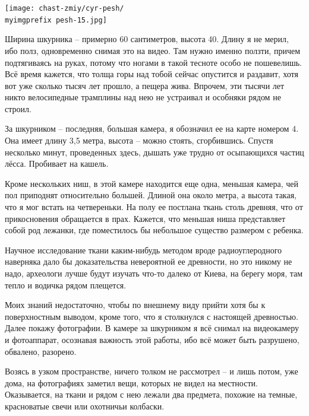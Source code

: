 \begin{center}
\texttt{[image: chast-zmiy/cyr-pesh/\\myimgprefix pesh-15.jpg]}
\end{center}

Ширина шкурника – примерно 60 сантиметров, высота 40. Длину я не мерил, ибо полз, одновременно снимая это на видео. Там нужно именно ползти, причем подтягиваясь на руках, потому что ногами в такой тесноте особо не пошевелишь. Всё время кажется, что толща горы над тобой сейчас опустится и раздавит, хотя вот уже сколько тысяч лет прошло, а пещера жива. Впрочем, эти тысячи лет никто велосипедные трамплины над нею не устраивал и особняки рядом не строил.


За шкурником – последняя, большая камера, я обозначил ее на карте номером 4. Она имеет длину 3,5 метра, высота – можно стоять, сгорбившись. Спустя несколько минут, проведенных здесь, дышать уже трудно от осыпающихся частиц лёсса. Пробивает на кашель.


Кроме нескольких ниш, в этой камере находится еще одна, меньшая камера, чей пол приподнят относительно большей. Длиной она около метра, а высота такая, что я мог встать на четвереньки. На полу ее постлана ткань столь древняя, что от прикосновения обращается в прах. Кажется, что меньшая ниша представляет собой род лежанки, где поместилось бы небольшое существо размером с ребенка.

Научное исследование ткани каким-нибудь методом вроде радиоуглеродного наверняка дало бы доказательства невероятной ее древности, но это никому не надо, археологи лучше будут изучать что-то далеко от Киева, на берегу моря, там тепло и водичка рядом плещется.

Моих знаний недостаточно, чтобы по внешнему виду прийти хотя бы к поверхностным выводом, кроме того, что я столкнулся с настоящей древностью. Далее покажу фотографии. В камере за шкурником я всё снимал на видеокамеру и фотоаппарат, осознавая важность этой работы, ибо всё может быть разрушено, обвалено, разорено.

Возясь в узком пространстве, ничего толком не рассмотрел – и лишь потом, уже дома, на фотографиях заметил вещи, которых не видел на местности. Оказывается, на ткани и рядом с нею лежали два предмета, похожие на темные, красноватые свечи или охотничьи колбаски.

